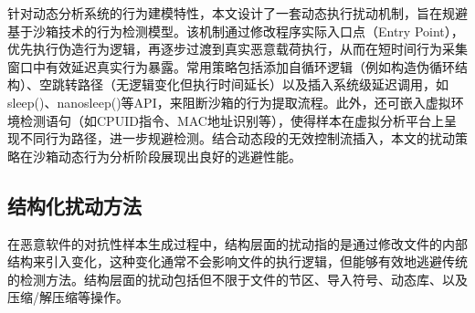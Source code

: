 针对动态分析系统的行为建模特性，本文设计了一套动态执行扰动机制，旨在规避基于沙箱技术的行为检测模型。该机制通过修改程序实际入口点（Entry Point），优先执行伪造行为逻辑，再逐步过渡到真实恶意载荷执行，从而在短时间行为采集窗口中有效延迟真实行为暴露。常用策略包括添加自循环逻辑（例如构造伪循环结构）、空跳转路径（无逻辑变化但执行时间延长）以及插入系统级延迟调用，如sleep()、nanosleep()等API，来阻断沙箱的行为提取流程。此外，还可嵌入虚拟环境检测语句（如CPUID指令、MAC地址识别等），使得样本在虚拟分析平台上呈现不同行为路径，进一步规避检测。结合动态段的无效控制流插入，本文的扰动策略在沙箱动态行为分析阶段展现出良好的逃避性能。


\subsection{结构化扰动方法}

在恶意软件的对抗性样本生成过程中，结构层面的扰动指的是通过修改文件的内部结构来引入变化，这种变化通常不会影响文件的执行逻辑，但能够有效地逃避传统的检测方法。结构层面的扰动包括但不限于文件的节区、导入符号、动态库、以及压缩/解压缩等操作。


